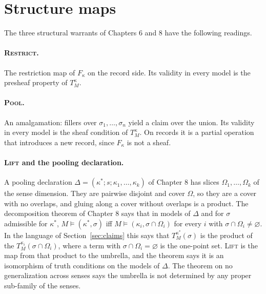 \documentclass[11pt]{article}
\theoremstyle{plain}
\theoremstyle{definition}
\theoremstyle{remark}
\newcommand{\Om}{\Omega}
\begin{document}
\section{Structure maps}\label{sec:maps}

The three structural warrants of Chapters 6 and 8 have the following readings.

\paragraph{\textsc{Restrict}.} The restriction map of $F_\kappa$ on the record side. Its validity in every model is the presheaf property of $T^\kappa_M$.

\paragraph{\textsc{Pool}.} An amalgamation: fillers over $\sigma_1,\dots,\sigma_n$ yield a claim over the union. Its validity in every model is the sheaf condition of $T^\kappa_M$. On records it is a partial operation that introduces a new record, since $F_\kappa$ is not a sheaf.

\paragraph{\textsc{Lift} and the pooling declaration.} A pooling declaration $\Delta=(\kappa^*;s;\kappa_1,\dots,\kappa_k)$ of Chapter 8 has slices $\Om_1,\dots,\Om_k$ of the sense dimension. They are pairwise disjoint and cover $\Om$, so they are a cover with no overlaps, and gluing along a cover without overlaps is a product. The decomposition theorem of Chapter 8 says that in models of $\Delta$ and for $\sigma$ admissible for $\kappa^*$, $M\models(\kappa^*,\sigma)$ iff $M\models(\kappa_i,\sigma\cap\Om_i)$ for every $i$ with $\sigma\cap\Om_i\neq\varnothing$. In the language of Section~\ref{sec:claims} this says that $T^{\kappa^*}_M(\sigma)$ is the product of the $T^{\kappa_i}_M(\sigma\cap\Om_i)$, where a term with $\sigma\cap\Om_i=\varnothing$ is the one-point set. \textsc{Lift} is the map from that product to the umbrella, and the theorem says it is an isomorphism of truth conditions on the models of $\Delta$. The theorem on no generalization across senses says the umbrella is not determined by any proper sub-family of the senses.
\end{document}
